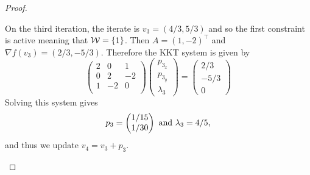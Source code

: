 \documentclass[12pt]{report}
\begin{document}
\begin{problem}
\begin{proof}
\begin{enumerate}
    On the third iteration, the iterate is $v_3 = (4/3,5/3)$ and so the first constraint is active meaning that $\mathcal{W} = {\left\{1\right\}}$. Then $A = (1, -2)^\top$ and $\nabla f(v_3) = (2/3, -5/3)$. Therefore the KKT system is given by
    \begin{equation*}
        \begin{pmatrix}
            2 & 0 & 1\\
            0 & 2 & -2\\
            1 & -2 & 0\\
        \end{pmatrix}\begin{pmatrix}
            p_{3_x}\\p_{3_y}\\\lambda_3
        \end{pmatrix}=\begin{pmatrix}
            2/3\\-5/3\\0
        \end{pmatrix}
    \end{equation*}
    Solving this system gives
    \begin{equation*}
        p_3 = \begin{pmatrix}
            1/15 \\ 1/30
        \end{pmatrix} {~\text{and}~} \lambda_3 = 4/5,
    \end{equation*}
    and thus we update $v_4 = v_3 + p_3$.


\end{enumerate}
\end{proof}
\end{problem}
\end{document}
